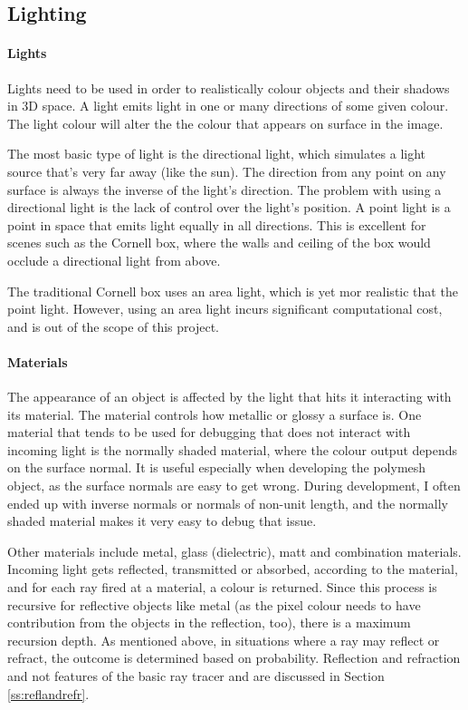 \documentclass[a4paper]{article}
\begin{document}
\subsection{Lighting}
\paragraph{Lights}
Lights need to be used in order to realistically colour objects and their shadows in 3D space. A light emits light in one or many directions of some given colour. The light colour will alter the the colour that appears on surface in the image.

The most basic type of light is the directional light, which simulates a light source that's very far away (like the sun). The direction from any point on any surface is always the inverse of the light's direction. The problem with using a directional light is the lack of control over the light's position. A point light is a point in space that emits light equally in all directions. This is excellent for scenes such as the Cornell box, where the walls and ceiling of the box would occlude a directional light from above.

The traditional Cornell box uses an area light, which is yet mor realistic that the point light. However, using an area light incurs significant computational cost, and is out of the scope of this project.

\paragraph{Materials}
The appearance of an object is affected by the light that hits it interacting with its material. The material controls how metallic or glossy a surface is. One material that tends to be used for debugging that does not interact with incoming light is the normally shaded material, where the colour output depends on the surface normal. It is useful especially when developing the polymesh object, as the surface normals are easy to get wrong. During development, I often ended up with inverse normals or normals of non-unit length, and the normally shaded material makes it very easy to debug that issue.

Other materials include metal, glass (dielectric), matt and combination materials. Incoming light gets reflected, transmitted or absorbed, according to the material, and for each ray fired at a material, a colour is returned. Since this process is recursive for reflective objects like metal (as the pixel colour needs to have contribution from the objects in the reflection, too), there is a maximum recursion depth. As mentioned above, in situations where a ray may reflect or refract, the outcome is determined based on probability. Reflection and refraction and not features of the basic ray tracer and are discussed in Section \ref{ss:reflandrefr}.
\end{document}
